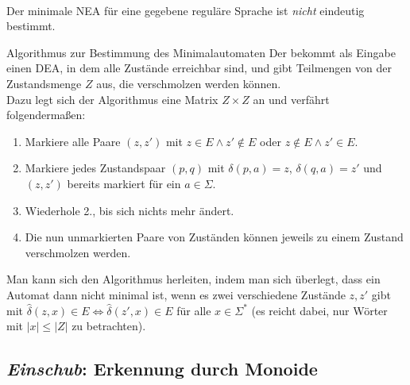 \begin{Bem}\\
    Der minimale NEA für eine gegebene reguläre Sprache ist \emph{nicht}
    eindeutig bestimmt.
\end{Bem}

\linie

\begin{Def}{Algorithmus zur Bestimmung des Minimalautomaten}
    Der  bekommt
    als Eingabe einen DEA, in dem alle Zustände erreichbar sind, und
    gibt Teilmengen von der Zustandsmenge $Z$ aus, die verschmolzen werden
    können.\\
    Dazu legt sich der Algorithmus eine Matrix $Z \times Z$ an und
    verfährt folgendermaßen:
    \begin{enumerate}
        \item
        Markiere alle Paare $(z, z')$ mit $z \in E \land z' \notin E$ oder
        $z \notin E \land z' \in E$.
        
        \item
        Markiere jedes Zustandspaar $(p, q)$ mit $\delta(p, a) = z$,
        $\delta(q, a) = z'$ und $(z, z')$ bereits markiert für ein
        $a \in \Sigma$.
        
        \item
        Wiederhole 2., bis sich nichts mehr ändert.
        
        \item
        Die nun unmarkierten Paare von Zuständen können jeweils zu einem
        Zustand verschmolzen werden.
    \end{enumerate}
\end{Def}

\begin{Bem}
    Man kann sich den Algorithmus herleiten, indem man sich überlegt, dass
    ein Automat dann nicht minimal ist, wenn es zwei verschiedene Zustände
    $z, z'$ gibt mit $\widehat{\delta}(z, x) \in E \iff
    \widehat{\delta}(z', x) \in E$ für alle $x \in \Sigma^\ast$
    (es reicht dabei, nur Wörter mit $|x| \le |Z|$ zu betrachten).
\end{Bem}

\pagebreak

\subsection{%
    \emph{Einschub}: Erkennung durch Monoide%
}


